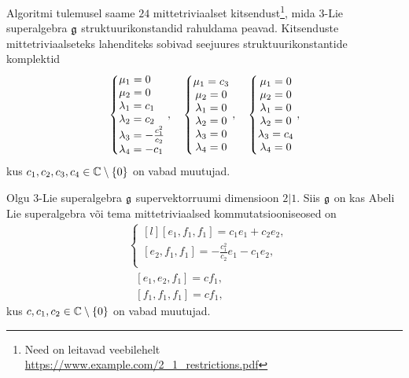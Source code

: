 Algoritmi tulemusel saame $24$ mittetriviaalset kitsendust\footnote{
Need on leitavad veebilehelt
\url{https://www.example.com/2_1_restrictions.pdf}},
mida $3$-Lie superalgebra $\mathfrak{g}$ struktuurikonstandid rahuldama peavad.
Kitsenduste mittetriviaalseteks lahenditeks sobivad seejuures
struktuurikonstantide komplektid
\renewcommand\arraystretch{1.3}
\begin{align*}
    \left\{ \begin{matrix*}[l]
        \m_1 = 0 \\
        \m_2 = 0 \\
        \l_1 = c_1 \\
        \l_2 = c_2 \\
        \l_3 = -\frac{c_1^2}{c_2} \\
        \l_4 = -c_1 \\
    \end{matrix*} \right.,
    \quad
    \left\{ \begin{matrix*}
        \m_1 = c_3 \\
        \m_2 = 0 \\
        \l_1 = 0 \\
        \l_2 = 0 \\
        \l_3 = 0 \\
        \l_4 = 0 \\
    \end{matrix*} \right.,
    \quad
    \left\{ \begin{matrix*}
        \m_1 = 0 \\
        \m_2 = 0 \\
        \l_1 = 0 \\
        \l_2 = 0 \\
        \l_3 = c_4 \\
        \l_4 = 0 \\
    \end{matrix*} \right.,
\end{align*}
\renewcommand\arraystretch{1}
kus $c_1, c_2, c_3, c_4 \in \mathbb{C} \setminus \{0\}$ on vabad muutujad.

\begin{thm}
    Olgu $3$-Lie superalgebra $\mathfrak{g}$ supervektorruumi dimensioon $2|1$.
    Siis $\mathfrak{g}$ on kas Abeli Lie superalgebra või tema mittetriviaalsed
    kommutatsiooniseosed on
    \renewcommand\arraystretch{1.2}
    \begin{align}
        & \left\{
            \begin{matrix*}[l]
                [e_1, f_1, f_1] = c_1 e_1 + c_2 e_2, \\
                [e_2, f_1, f_1] = -\frac{c_1^2}{c_2} e_1 - c_1 e_2, \\
            \end{matrix*}
        \right. \\[0.2cm]
        &\ \ \ [e_1, e_2, f_1] = c f_1, \\[0.2cm]
        &\ \ \ [f_1, f_1, f_1] = c f_1,
    \end{align}
    \renewcommand\arraystretch{1}
    kus $c, c_1, c_2 \in \mathbb{C} \setminus \{ 0 \}$ on vabad muutujad.
\end{thm}
